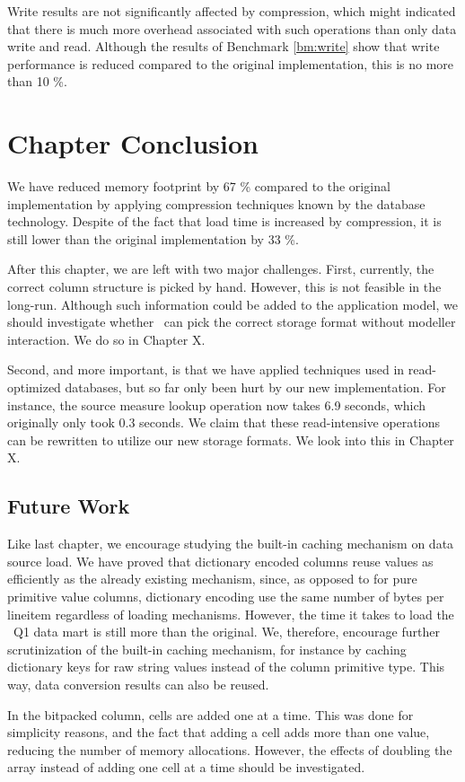 Write results are not significantly affected by compression, which might indicated that there is much more overhead associated with such operations than only data write and read. Although the results of Benchmark \ref{bm:write} show that write performance is reduced compared to the original implementation, this is no more than 10 \%.

\section{Chapter Conclusion}
\label{sec:Chapter Conclusion}
We have reduced memory footprint by 67 \% compared to the original implementation by applying compression techniques known by the database technology. Despite of the fact that load time is increased by compression, it is still lower than the original implementation by 33 \%.

After this chapter, we are left with two major challenges. First, currently, the correct column structure is picked by hand. However, this is not feasible in the long-run. Although such information could be added to the application model, we should investigate whether \gap~can pick the correct storage format without modeller interaction. We do so in Chapter X.

Second, and more important, is that we have applied techniques used in read-optimized databases, but so far only been hurt by our new implementation. For instance, the source measure lookup operation now takes 6.9 seconds, which originally only took 0.3 seconds. We claim that these read-intensive operations can be rewritten to utilize our new storage formats. We look into this in Chapter X.

\subsection{Future Work}
\label{sub:Future Work}
Like last chapter, we encourage studying the built-in caching mechanism on data source load. We have proved that dictionary encoded columns reuse values as efficiently as the already existing mechanism, since, as opposed to for pure primitive value columns, dictionary encoding use the same number of bytes per lineitem regardless of loading mechanisms. However, the time it takes to load the \tpch~Q1 data mart is still more than the original. We, therefore, encourage further scrutinization of the built-in caching mechanism, for instance by caching dictionary keys for raw string values instead of the column primitive type. This way, data conversion results can also be reused.

In the bitpacked column, cells are added one at a time. This was done for simplicity reasons, and the fact that adding a cell adds more than one value, reducing the number of memory allocations. However, the effects of doubling the array instead of adding one cell at a time should be investigated.



